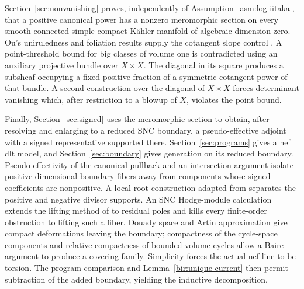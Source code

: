 Section~\ref{sec:nonvanishing} proves, independently of
Assumption~\ref{asm:log-iitaka}, that a positive canonical power has a nonzero
meromorphic section on every smooth connected simple compact Kähler manifold
of algebraic dimension zero. Ou's uniruledness and foliation results supply
the cotangent slope control \cite{Ou2025}. A point-threshold bound for big
classes of volume one is contradicted using an auxiliary projective bundle
over \(X\times X\). The diagonal in its square produces a subsheaf occupying
a fixed positive fraction of a symmetric cotangent power of that bundle.
A second construction over the diagonal of \(X\times X\) forces determinant
vanishing which, after restriction to a blowup of \(X\), violates the point
bound.

Finally, Section~\ref{sec:signed} uses the meromorphic section to obtain,
after resolving and enlarging to a reduced SNC boundary, a pseudo-effective
adjoint with a signed representative supported there.
Section~\ref{sec:programs} gives a nef dlt model, and
Section~\ref{sec:boundary} gives generation on its reduced boundary.
Pseudo-effectivity of the canonical pullback and an intersection argument
isolate positive-dimensional boundary fibers away from components whose
signed coefficients are nonpositive. A local root construction adapted from
\cite[Proposition~3.3]{LI} separates the positive and negative divisor
supports. An SNC Hodge-module calculation extends the lifting method of
\cite[Sections~10--12]{BL} to residual poles and kills every finite-order
obstruction to lifting such a fiber. Douady space and Artin approximation
give compact deformations leaving the boundary; compactness of the cycle-space
components and relative compactness of bounded-volume cycles allow a Baire
argument to produce a covering family. Simplicity
forces the actual nef line to be torsion. The program comparison and
Lemma~\ref{bir:unique-current} then permit subtraction of the added boundary,
yielding the inductive decomposition.
